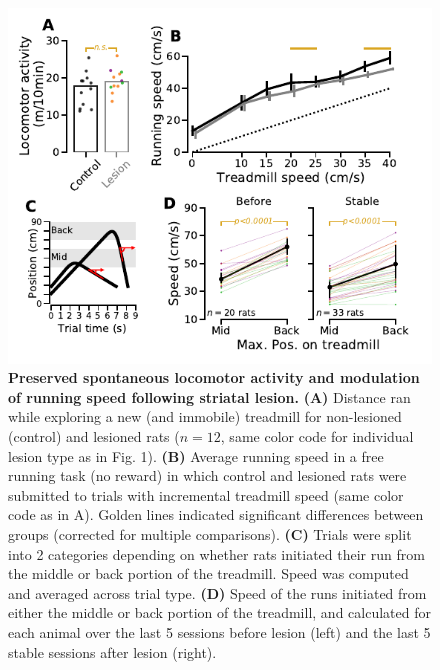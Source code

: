 \begin{figure}[bth!]
	\begin{center}
	   \includegraphics[scale=1]{ch-lesion/figures/MotorPreserved.pdf}
	   \caption
	   {\textbf{Preserved spontaneous locomotor activity and modulation of running speed following striatal lesion.}
	   \textbf{(A)} Distance ran while exploring a new (and immobile) treadmill for non-lesioned (control) and lesioned rats ($n=12$, same color code for individual lesion type as in Fig. 1).
	   \textbf{(B)} Average running speed in a free running task (no reward) in which control and lesioned rats were submitted to trials with incremental treadmill speed (same color code as in A).
	   Golden lines indicated significant differences between groups (corrected for multiple comparisons).
	   \textbf{(C)} Trials were split into 2 categories depending on whether rats initiated their run from the middle or back portion of the treadmill. Speed was computed and averaged across trial type.
	   \textbf{(D)} Speed of the runs initiated from either the middle or back portion of the treadmill, and calculated for each animal over the last 5 sessions before lesion (left) and the last 5 stable sessions after lesion (right).
	   }
	   \label{fig:lesion:motorOk}
	\end{center}
   \end{figure}